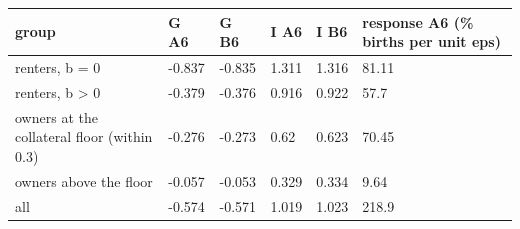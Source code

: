 \begingroup\small
\setlength{\tabcolsep}{3pt}
\renewcommand{\arraystretch}{1.04}
\begin{tabularx}{\linewidth}{XXXXXX}
\toprule
group & G A6 & G B6 & I A6 & I B6 & response A6 (\% births per unit eps) \\
\midrule
renters, b = 0 & -0.837 & -0.835 & 1.311 & 1.316 & 81.11 \\
renters, b \textgreater{} 0 & -0.379 & -0.376 & 0.916 & 0.922 & 57.7 \\
owners at the collateral floor (within 0.3) & -0.276 & -0.273 & 0.62 & 0.623 & 70.45 \\
owners above the floor & -0.057 & -0.053 & 0.329 & 0.334 & 9.64 \\
all & -0.574 & -0.571 & 1.019 & 1.023 & 218.9 \\
\bottomrule
\end{tabularx}
\endgroup
